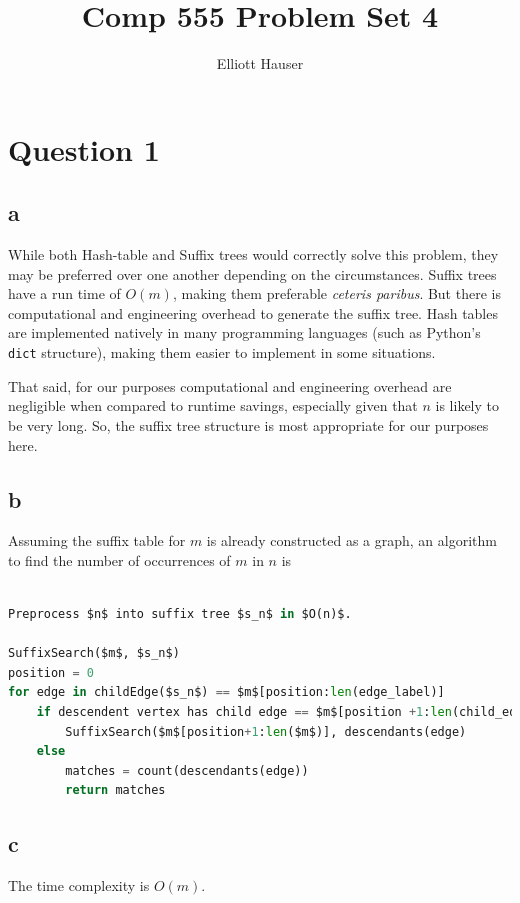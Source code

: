 \documentclass[12pt]{article}
\author{Elliott Hauser}
\title{Comp 555 Problem Set 4}
\begin{document}
\maketitle
\section*{Question 1}
\subsection*{a}  While both Hash-table and Suffix trees would correctly solve this problem, they may be preferred over one another depending on the circumstances.  Suffix trees have a run time of $O(m)$, making them preferable \textit{ceteris paribus}.  But there is computational and engineering overhead to generate the suffix tree. Hash tables are implemented natively in many programming languages (such as Python's \lstinline{dict} structure), making them easier to implement in some situations.

That said, for our purposes computational and engineering overhead are negligible when compared to runtime savings, especially given that $n$ is likely to be very long.  So, the suffix tree structure is most appropriate for our purposes here.

\subsection*{b} Assuming the suffix table for $m$ is already constructed as a graph, an algorithm to find the number of occurrences of $m$ in $n$ is
\begin{lstlisting}[language=python, mathescape=true]

Preprocess $n$ into suffix tree $s_n$ in $O(n)$.

SuffixSearch($m$, $s_n$)
position = 0
for edge in childEdge($s_n$) == $m$[position:len(edge_label)]
	if descendent vertex has child edge == $m$[position +1:len(child_edge_label)]
		SuffixSearch($m$[position+1:len($m$)], descendants(edge)
	else
		matches = count(descendants(edge))
		return matches

\end{lstlisting}

\subsection*{c}  The time complexity is %
$O(m)$.
\end{document}
